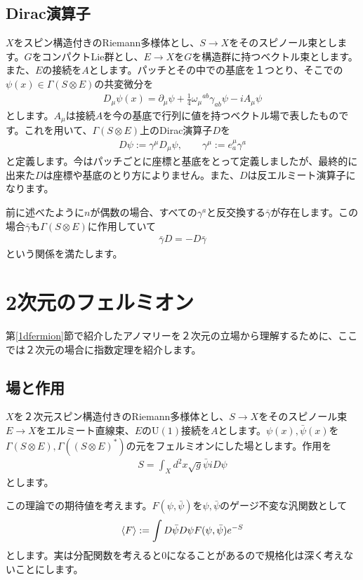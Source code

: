 \documentclass[paper=a4, fontsize=12pt, line_length=16cm, number_of_lines=33,dvipdfmx]{jlreq}
\numberwithin{equation}{section}
\newcommand{\del}{\partial}
\newcommand{\psib}{\bar{\psi}}
\newcommand{\gammab}{\bar{\gamma}}
\newcommand{\U}{\mathrm{U}}
\begin{document}
\subsection{Dirac演算子}\label{subsec:spinorsetup}
$X$をスピン構造付きのRiemann多様体とし、$S\to X$をそのスピノール束とします。$G$をコンパクトLie群とし、$E\to X$を$G$を構造群に持つベクトル束とします。また、$E$の接続を$A$とします。パッチとその中での基底を１つとり、そこでの$\psi(x)\in \Gamma(S\otimes E)$の共変微分を
\begin{align}
  D_{\mu}\psi(x)=\del_{\mu}\psi+\frac14\omega_{\mu}{}^{ab}\gamma_{ab}\psi-iA_{\mu}\psi
\end{align}
とします。$A_{\mu}$は接続$A$を今の基底で行列に値を持つベクトル場で表したものです。これを用いて、$\Gamma(S\otimes E)$上のDirac演算子$D$を
\begin{align}
  D\psi:=\gamma^{\mu}D_{\mu}\psi,\qquad \gamma^{\mu}:=e^{\mu}_{a}\gamma^{a}
\end{align}
と定義します。今はパッチごとに座標と基底をとって定義しましたが、最終的に出来た$D$は座標や基底のとり方によりません。また、$D$は反エルミート演算子になります。

前に述べたように$n$が偶数の場合、すべての$\gamma^a$と反交換する$\gammab$が存在します。この場合$\gammab$も$\Gamma(S\otimes E)$に作用していて
\begin{align}
  \gammab D=-D\gammab
\end{align}
という関係を満たします。

\section{2次元のフェルミオン}\label{sec:massless}
第\ref{1dfermion}節で紹介したアノマリーを２次元の立場から理解するために、ここでは２次元の場合に指数定理を紹介します。

\subsection{場と作用}\label{subsec:2dsetup}
$X$を２次元スピン構造付きのRiemann多様体とし、$S\to X$をそのスピノール束$E\to X$をエルミート直線束、$E$の$\U(1)$接続を$A$とします。$\psi(x),\psib(x)$を$\Gamma(S\otimes E),\Gamma((S\otimes E)^{*})$の元をフェルミオンにした場とします。作用を
\begin{align}
  S=\int_{X}d^2x\sqrt{g}\psib iD \psi
  \label{2dmasslessaction}
\end{align}
とします。

この理論での期待値を考えます。$F(\psi,\psib)$を$\psi,\psib$のゲージ不変な汎関数として
\begin{align}
  \expval{F}:=\int D\psib D\psi F(\psi,\psib) e^{-S}
  \label{2dmasslessexpval}
\end{align}
とします。実は分配関数を考えると$0$になることがあるので規格化は深く考えないことにします。
\end{document}
